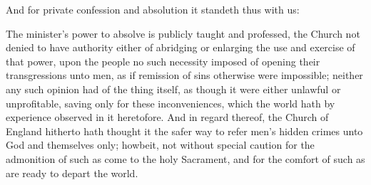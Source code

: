 And for private confession and absolution it standeth thus with us:

The minister’s power to absolve is publicly taught and professed, the Church not denied to have authority either of abridging or enlarging the use and exercise of that power, upon the people no such necessity imposed of opening their transgressions unto men, as if remission of sins otherwise were impossible; neither any such opinion had of the thing itself, as though it were either unlawful or unprofitable, saving only for these inconveniences, which the world hath by experience observed in it heretofore. And in regard thereof, the Church of England hitherto hath thought it the safer way to refer men’s hidden crimes unto God and themselves only; howbeit, not without special caution for the admonition of such as come to the holy Sacrament, and for the comfort of such as are ready to depart the world.

